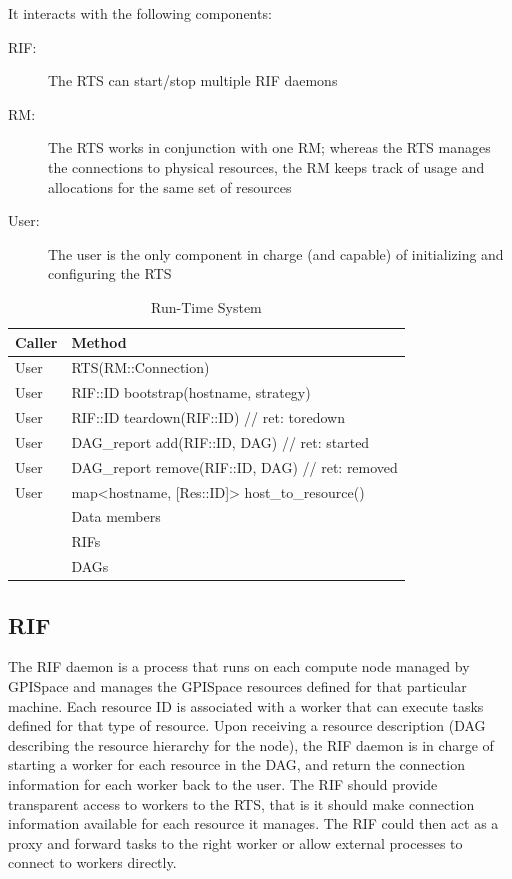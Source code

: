 \documentclass[10pt]{article}
\newcommand{\user}{User\xspace}
\newcommand{\rts}{RTS\xspace}
\newcommand{\rman}{RM\xspace}
\newcommand{\rif}{RIF\xspace}
\newcommand{\rdag}{DAG\xspace}
\newcommand{\rdagrep}{DAG\_report\xspace}
\newcommand{\res}{Res\xspace}
\newcommand{\id}{::ID\xspace}
\newcommand{\conn}{::Connection\xspace}
\begin{document}
It interacts with the following components:
\begin{description}
    \item [\rif:] The \rts can start/stop multiple \rif daemons
    \item [\rman:] The \rts works in conjunction with one \rman; whereas the
    \rts manages the connections to physical resources, the \rman keeps track of
    usage and allocations for the same set of resources  
    \item [\user:] The user is the only component in charge (and capable) of
    initializing and configuring the \rts
\end{description}
%
\begin{table}[ht]
    \centering
    \caption{Run-Time System}
    \label{tab:rts}
    \bgroup
    \setlength{\tabcolsep}{2em}
    \begin{tabular}{ll}
        \toprule
        Caller & Method \\
        \midrule
        \user & \rts(\rman\conn) \\
        \user & \rif\id bootstrap(hostname, strategy) \\
        \user & \rif\id teardown(\rif\id)    // ret: toredown \\
        \user & \rdagrep add(\rif\id, \rdag) // ret: started \\
        \user & \rdagrep remove(\rif\id, \rdag) // ret: removed \\
        \user & map<hostname, [\res\id]> host\_to\_resource() \\
        \midrule
        & Data members \\        
        \midrule
        & RIFs \\
        & DAGs \\
        \bottomrule
    \end{tabular}
    \egroup
\end{table}
%

\subsection{RIF}

The \rif daemon is a process that runs on each compute node managed by GPISpace
and manages the GPISpace resources defined for that particular machine.
Each resource ID is associated with a worker that can execute tasks defined for
that type of resource.
Upon receiving a resource description (DAG describing the resource hierarchy for
the node), the \rif daemon is in charge of starting a worker for each resource
in the DAG, and return the connection information for each worker back to the
user.
The \rif should provide transparent access to workers to the \rts, that is it
should make connection information available for each resource it manages. The
\rif could then act as a proxy and forward tasks to the right worker or allow
external processes to connect to workers directly.
\end{document}
